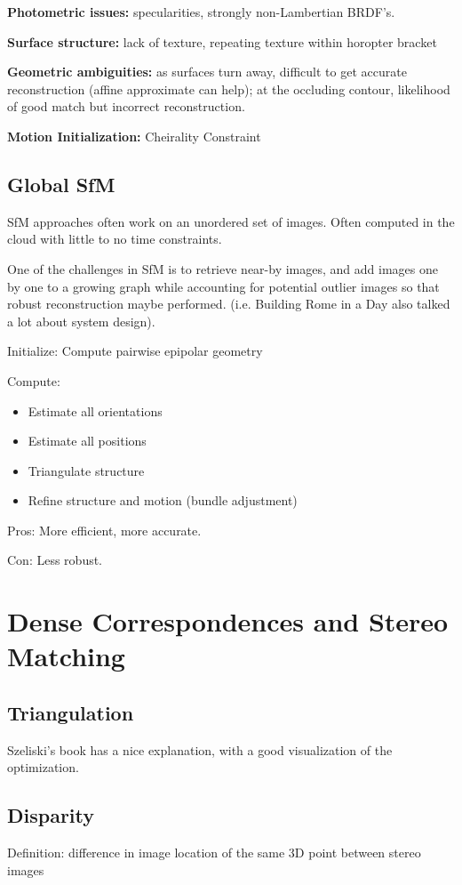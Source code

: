 \textbf{Photometric issues:} specularities, strongly non-Lambertian BRDF’s.

\textbf{Surface structure:} lack of texture, repeating texture within horopter bracket

\textbf{Geometric ambiguities:} as surfaces turn away, difficult to get accurate reconstruction (affine approximate can help); at the occluding contour, likelihood of good match but incorrect reconstruction. 

\textbf{Motion Initialization:} Cheirality Constraint

\subsection{Global SfM}

SfM approaches often work on an unordered set of images. Often computed in the cloud with little to no time constraints.

One of the challenges in SfM is to retrieve near-by images, and add images one by one to a growing graph while accounting for potential outlier images so that robust reconstruction maybe performed. (i.e. Building Rome in a Day also talked a lot about system design).

Initialize: Compute pairwise epipolar geometry

Compute:
\begin{itemize}
\item Estimate all orientations
\item Estimate all positions
\item Triangulate structure
\item Refine structure and motion (bundle adjustment)
\end{itemize}

Pros: More efficient, more accurate.

Con: Less robust.

\section{Dense Correspondences and Stereo Matching}

\subsection{Triangulation}
Szeliski's book has a nice explanation, with a good visualization of the optimization.

\subsection{Disparity}
Definition: difference in image location of the same 3D point between stereo images

